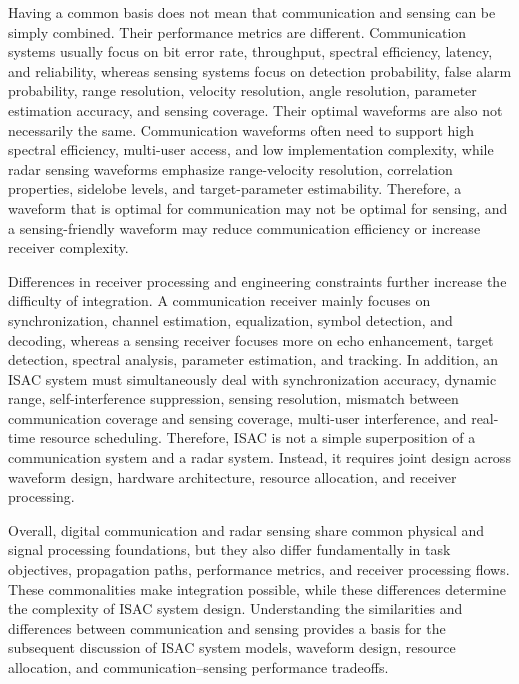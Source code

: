 Having a common basis does not mean that communication and sensing can be
simply combined.
Their performance metrics are different.
Communication systems usually focus on bit error rate, throughput, spectral
efficiency, latency, and reliability, whereas sensing systems focus on
detection probability, false alarm probability, range resolution, velocity
resolution, angle resolution, parameter estimation accuracy, and sensing
coverage.
Their optimal waveforms are also not necessarily the same.
Communication waveforms often need to support high spectral efficiency,
multi-user access, and low implementation complexity, while radar sensing
waveforms emphasize range-velocity resolution, correlation properties, sidelobe
levels, and target-parameter estimability.
Therefore, a waveform that is optimal for communication may not be optimal for
sensing, and a sensing-friendly waveform may reduce communication efficiency or
increase receiver complexity.

Differences in receiver processing and engineering constraints further
increase the difficulty of integration.
A communication receiver mainly focuses on synchronization, channel estimation,
equalization, symbol detection, and decoding, whereas a sensing receiver
focuses more on echo enhancement, target detection, spectral analysis,
parameter estimation, and tracking.
In addition, an ISAC system must simultaneously deal with synchronization
accuracy, dynamic range, self-interference suppression, sensing resolution,
mismatch between communication coverage and sensing coverage, multi-user
interference, and real-time resource scheduling.
Therefore, ISAC is not a simple superposition of a communication system and a
radar system.
Instead, it requires joint design across waveform design, hardware
architecture, resource allocation, and receiver processing.

Overall, digital communication and radar sensing share common physical and
signal processing foundations, but they also differ fundamentally in task
objectives, propagation paths, performance metrics, and receiver processing
flows.
These commonalities make integration possible, while these differences
determine the complexity of ISAC system design.
Understanding the similarities and differences between communication and
sensing provides a basis for the subsequent discussion of ISAC system models,
waveform design, resource allocation, and communication--sensing performance
tradeoffs.
